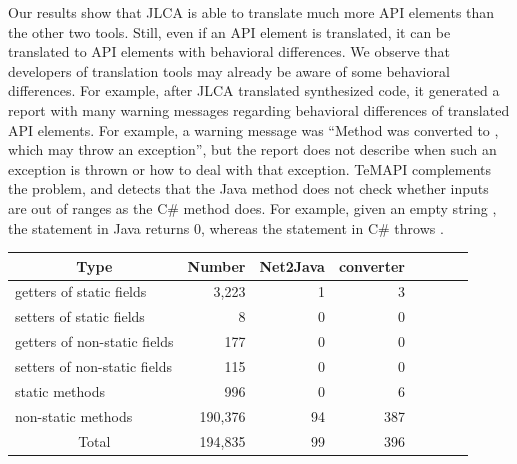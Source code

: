 Our results show that JLCA is able to translate much more API elements than the other two tools. Still, even if an API element is translated, it can be translated to API elements with behavioral differences. We observe that developers of translation tools may already be aware of some behavioral differences. For example, after JLCA translated synthesized code, it generated a report with many warning messages regarding behavioral differences of translated API elements. For example, a warning message was ``Method  was converted to , which may throw an exception'', but the report does not describe when such an exception is thrown or how to deal with that exception. TeMAPI complements the problem, and detects that the Java method does not check whether inputs are out of ranges as the C\# method does. For example, given an empty string , the  statement in Java returns 0, whereas the  statement in C\# throws .
\begin{table}[t]
\centering
\begin{SmallOut}
\begin {tabular} {|l|r|r|r|r|r|c|c|}
 \hline
\multicolumn{1}{|c}{\textbf{Type}} & \multicolumn{1}{|c}{\textbf{Number}}
& \multicolumn{1}{|c|}{\textbf{Net2Java}} & \multicolumn{1}{|c|}{\textbf{converter}}\\
\hline
getters of static fields      &  3,223 & 1    &  3     \\
\hline
setters of static fields      &  8    & 0    &  0       \\
\hline
getters of non-static fields  &   177 & 0    &  0    \\
\hline
setters of non-static fields  &   115 & 0    &  0    \\
\hline
static methods                &   996 & 0    &  6  \\
\hline
non-static methods            &190,376& 94    &  387     \\
\hline
\multicolumn{1}{|c|}{Total}   &194,835& 99     &  396 \\
\hline
\end{tabular}%
 \label{table:csharp2java}
\end{SmallOut}\vspace*{-6ex}
\end{table}



